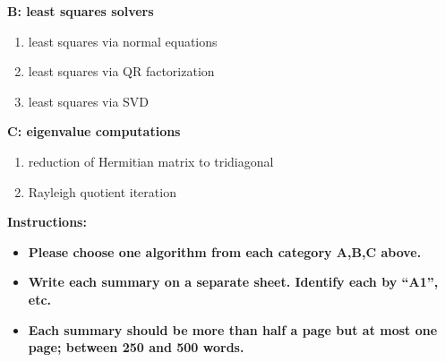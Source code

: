\documentclass[12pt]{amsart}
\begin{document}
\noindent\textbf{B: least squares solvers}

\renewcommand{\labelenumi}{B\arabic{enumi}.}
\begin{enumerate}
\setlength{\itemsep}{4pt}
\item least squares via normal equations 
\item least squares via QR factorization 
\item least squares via SVD 
\end{enumerate}

\noindent\textbf{C: eigenvalue computations}

\renewcommand{\labelenumi}{C\arabic{enumi}.}
\begin{enumerate}
\setlength{\itemsep}{4pt}
\item reduction of Hermitian matrix to tridiagonal 
\item Rayleigh quotient iteration 
\end{enumerate}

\bigskip
\noindent \hrulefill

\noindent \textbf{\large Instructions:}

\begin{itemize}
\item \textbf{Please choose one algorithm from each category A,B,C above.}
\item \textbf{Write each summary on a separate sheet.  Identify each by ``A1'', etc.}
\item \textbf{Each summary should be more than half a page but at most one page; between 250 and 500 words.}
\end{itemize}
\end{document}
